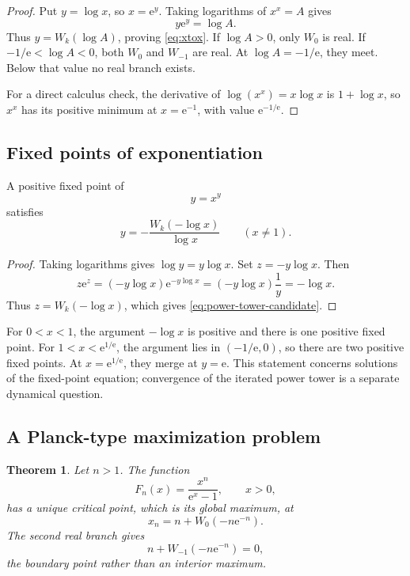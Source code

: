 \documentclass[11pt]{article}
\newtheorem{theorem}{Theorem}[section]
\theoremstyle{remark}
\newcommand{\ee}{\mathrm e}
\begin{document}
\begin{proof}
Put \(y=\log x\), so \(x=\ee^y\).  Taking logarithms of \(x^x=A\) gives
\[
       y\ee^y=\log A.
\]
Thus \(y=W_k(\log A)\), proving \eqref{eq:xtox}.  If \(\log A>0\), only
\(W_0\) is real.  If \(-1/\ee<\log A<0\), both \(W_0\) and \(W_{-1}\)
are real.  At \(\log A=-1/\ee\), they meet.  Below that value no real branch
exists.

For a direct calculus check, the derivative of
\(\log(x^x)=x\log x\) is \(1+\log x\), so \(x^x\) has its positive minimum
at \(x=\ee^{-1}\), with value \(\ee^{-1/\ee}\).
\end{proof}

\subsection{Fixed points of exponentiation}

A positive fixed point of
\[
       y=x^y
\]
satisfies
\begin{equation}\label{eq:power-tower-candidate}
       y=-\frac{W_k(-\log x)}{\log x}
       \qquad(x\neq1).
\end{equation}

\begin{proof}
Taking logarithms gives \(\log y=y\log x\).  Set
\(z=-y\log x\).  Then
\[
       z\ee^z=(-y\log x)\ee^{-y\log x}
             =(-y\log x)\frac1y
             =-\log x.
\]
Thus \(z=W_k(-\log x)\), which gives
\eqref{eq:power-tower-candidate}.
\end{proof}

For \(0<x<1\), the argument \(-\log x\) is positive and there is one positive
fixed point.  For \(1<x<\ee^{1/\ee}\), the argument lies in
\((-1/\ee,0)\), so there are two positive fixed points.  At
\(x=\ee^{1/\ee}\), they merge at \(y=\ee\).  This statement concerns
solutions of the fixed-point equation; convergence of the iterated power
tower is a separate dynamical question.

\subsection{A Planck-type maximization problem}

\begin{theorem}\label{thm:planckmax}
Let \(n>1\).  The function
\[
       F_n(x)=\frac{x^n}{\ee^x-1},\qquad x>0,
\]
has a unique critical point, which is its global maximum, at
\begin{equation}\label{eq:planckmax}
       x_n=n+W_0(-n\ee^{-n}).
\end{equation}
The second real branch gives
\[
       n+W_{-1}(-n\ee^{-n})=0,
\]
the boundary point rather than an interior maximum.
\end{theorem}
\end{document}
